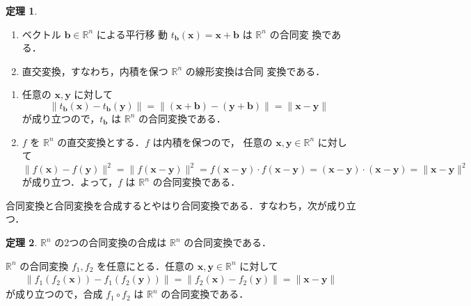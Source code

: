 \documentclass[11pt, uplatex, dvipdfmx, titlepage]{jsarticle}
\makeatletter
\renewenvironment{proof}[1][\proofname]{\par
  \pushQED{\qed}%
  \normalfont \topsep6\p@\@plus6\p@\relax
  \trivlist
  \item[\hskip\labelsep
         \bfseries
    {#1}]\ignorespaces
}{%
  \popQED\endtrivlist\@endpefalse
}
\theoremstyle{definition}
\newtheorem{theorem}{定理}[section]
\renewcommand{\proofname}{\textbf{証明}}
\makeatother
\begin{document}
\begin{theorem}\label{thm:trans-orth}
  \begin{enumerate}[(1)]
  \item ベクトル $\bm{b} \in \mathbb{R}^n$ による平行移
    動 $t_{\bm{b}}(\bm{x}) = \bm{x} + \bm{b}$ は $\mathbb{R}^n$ の合同変
    換である．
  \item 直交変換，すなわち，内積を保つ $\mathbb{R}^n$ の線形変換は合同
    変換である．
  \end{enumerate}
    \begin{proof}
      \begin{enumerate}[(1)]
      \item 任意の $\bm{x}, \bm{y}$ に対して
      \[
        \|t_{\bm{b}}(\bm{x}) - t_{\bm{b}}(\bm{y})\| =\|(\bm{x}+\bm{b}) -
        (\bm{y}+\bm{b})\| = \|\bm{x}-\bm{y}\|
      \]
      が成り立つので，$t_{\bm{b}}$ は $\mathbb{R}^n$ の合同変換である．
      
    \item $f$ を $\mathbb{R}^n$ の直交変換とする．$f$ は内積を保つので，
      任意の $\bm{x}, \bm{y} \in \mathbb{R}^n$ に対して
      \[
        \|f(\bm{x}) - f(\bm{y})\|^2 = \|f(\bm{x}-\bm{y})\|^2 = f(\bm{x}-\bm{y}) \cdot  f(\bm{x}-\bm{y})
        = (\bm{x}-\bm{y}) \cdot (\bm{x}-\bm{y}) = \|\bm{x}-\bm{y}\|^2
      \]
      が成り立つ．よって，$f$ は $\mathbb{R}^n$ の合同変換である．
    \end{enumerate}
  \end{proof}
\end{theorem}

合同変換と合同変換を合成するとやはり合同変換である．すなわち，次が成り立つ．

\begin{theorem}\label{thm:comp_isom}
  $\mathbb{R}^n$ の2つの合同変換の合成は $\mathbb{R}^n$ の合同変換である．
\end{theorem}

\begin{proof}
  $\mathbb{R}^n$ の合同変換 $f_1, f_2$ を任意にとる．任意の $\bm{x}, \bm{y} \in \mathbb{R}^n$ に対して
  \begin{align*}
    \|f_1 \left(f_2 \left(\bm{x}\right)\right)-f_1 \left(f_2\left(\bm{y}\right)\right)\|
    = \| f_2(\bm{x})- f_2(\bm{y}) \| = \|\bm{x}- \bm{y}\|
  \end{align*}
  が成り立つので，合成 $f_1 \circ f_2$ は $\mathbb{R}^n$ の合同変換である．
\end{proof}

\newpage
\end{document}
